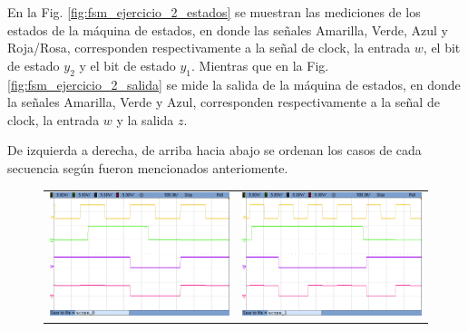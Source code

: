 En la Fig. \ref{fig:fsm_ejercicio_2_estados} se muestran las mediciones de los estados de la m\'aquina de estados, en donde las se\~nales Amarilla, Verde, Azul y Roja/Rosa,
corresponden respectivamente a la se\~nal de clock, la entrada $w$, el bit de estado $y_2$ y el bit de estado $y_1$. Mientras que en la Fig. \ref{fig:fsm_ejercicio_2_salida} se mide
la salida de la m\'aquina de estados, en donde la se\~nales Amarilla, Verde y Azul, corresponden respectivamente a la se\~nal de clock, la entrada $w$ y la salida $z$.

De izquierda a derecha, de arriba hacia abajo se ordenan los casos de cada secuencia seg\'un fueron mencionados anteriomente.

\begin{figure}[H]
    \centering
    \begin{tabular}{c c}
        \includegraphics[scale=0.2]{../EJ2/Mediciones/Estados/cropped_scope_0.png} & 
        \includegraphics[scale=0.2]{../EJ2/Mediciones/Estados/cropped_scope_1.png} \\ 

\end{tabular}
\end{figure}
